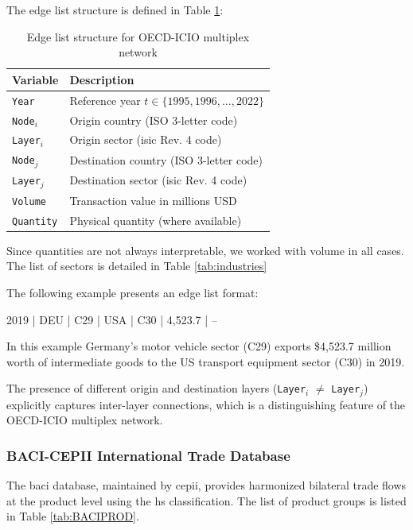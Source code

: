 \documentclass[preprint, 3p,
authoryear]{elsarticle} %
\begin{document}
The edge list structure is defined in Table \ref{tab:oecd_edgelist}:

\begin{table}[ht]
\centering
\caption{Edge list structure for OECD-ICIO multiplex network}
\label{tab:oecd_edgelist}
\begin{tabular}{@{}lp{9cm}@{}}
\toprule
\textbf{Variable} & \textbf{Description} \\
\midrule
\texttt{Year} & Reference year $t \in \{1995, 1996, \ldots, 2022\}$ \\
\texttt{Node$_i$} & Origin country (ISO 3-letter code) \\
\texttt{Layer$_i$} & Origin sector (\gls{isic} Rev. 4 code) \\
\texttt{Node$_j$} & Destination country (ISO 3-letter code) \\
\texttt{Layer$_j$} & Destination sector (\gls{isic} Rev. 4 code) \\
\texttt{Volume} & Transaction value in millions USD \\
\texttt{Quantity} & Physical quantity (where available) \\
\bottomrule
\end{tabular}
\end{table}

Since quantities are not always interpretable, we worked with volume in
all cases. The list of sectors is detailed in Table \ref{tab:industries}

The following example presents an edge list format:

\begin{center}
2019 | DEU | C29 | USA | C30 | 4,523.7 | --
\end{center}

In this example Germany's motor vehicle sector (C29) exports \$4,523.7
million worth of intermediate goods to the US transport equipment sector
(C30) in 2019.

The presence of different origin and destination layers
(\texttt{Layer$_i$} \(\neq\) \texttt{Layer$_j$}) explicitly captures
inter-layer connections, which is a distinguishing feature of the
OECD-ICIO multiplex network.

\subsubsection{BACI-CEPII International Trade
Database}\label{subsec:cepii_baci}

The \gls{baci} database, maintained by \gls{cepii}, provides harmonized
bilateral trade flows at the product level using the \gls{hs}
classification. The list of product groups is listed in Table
\ref{tab:BACIPROD}.
\end{document}
